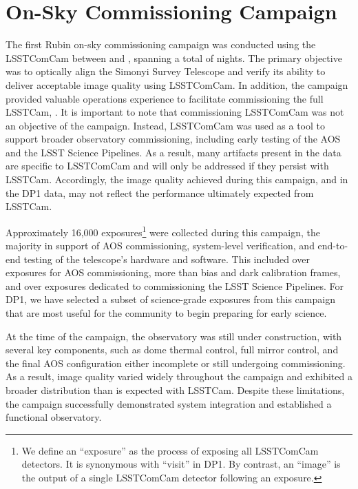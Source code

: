 \section{On-Sky Commissioning Campaign \label{sec:on_sky_campaign}}

The first Rubin on-sky commissioning campaign was conducted using the \gls{LSSTComCam} between \campaignstartdate and \dponeenddate, spanning a total of \nnightscomcam nights.
The primary objective was to optically align the Simonyi Survey Telescope and verify its ability to deliver acceptable image quality using \gls{LSSTComCam}.
In addition, the campaign provided valuable operations experience to facilitate commissioning the full \gls{LSSTCam}, \citep{2024SPIE13096E..1SR,2024SPIE13096E..1OL}.
It is important to note that commissioning \gls{LSSTComCam}  was not an objective of the campaign.
Instead, LSSTComCam was used as a tool to support broader observatory commissioning, including early testing of the \gls{AOS} and the LSST Science Pipelines.
As a result,
many artifacts present in the data are specific to \gls{LSSTComCam} and will only be addressed if they persist with \gls{LSSTCam}.
Accordingly, the image quality achieved during this campaign, and in the \gls{DP1} data, may not reflect the performance ultimately expected from \gls{LSSTCam}.

Approximately 16,000 exposures\footnote{We define an ``exposure'' as the process of exposing all LSSTComCam detectors. It is synonymous with ``visit'' in DP1. By contrast, an ``image'' is the output of a single LSSTComCam detector following an exposure.} were collected during this campaign, the majority in support of \gls{AOS} commissioning, system-level verification, and end-to-end testing of the telescope’s hardware and software.
This included over \nexposuresaoscommissioning exposures for \gls{AOS} commissioning, more than \nexposurescalibcommissioning bias and dark calibration frames, and over \nexposuresspcommissioning exposures dedicated to commissioning the LSST Science Pipelines.
For \gls{DP1}, we have selected a subset of \nexposures science-grade exposures from this campaign that are most useful for the community to begin preparing for early science.

At the time of the campaign, the observatory was still under construction, with several key components, such as dome thermal control, full mirror control, and the final \gls{AOS} configuration either incomplete or still undergoing commissioning.
As a result, image quality varied widely throughout the campaign and exhibited a broader distribution than is expected with \gls{LSSTCam}.
Despite these limitations, the campaign successfully demonstrated system integration and established a functional observatory.


